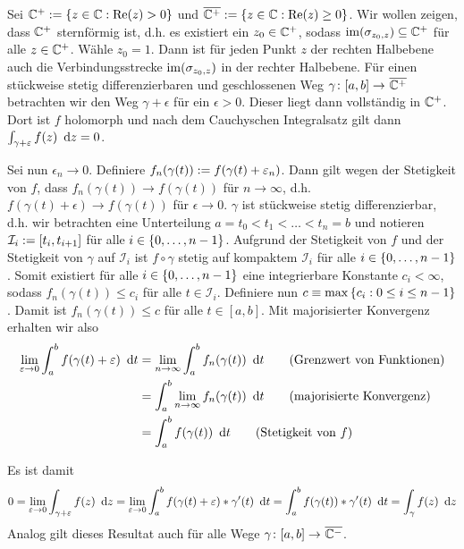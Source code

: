\begin{exercisePage}
	\pagebreak

	Sei $\mathbb{C}^+ \mathrel{:=} \left\{ z \in \mathbb{C} : \operatorname{Re}(z) > 0 \right\}$ und $\overline{\mathbb{C}^+} \mathrel{:=} \left\{ z \in \mathbb{C} : \operatorname{Re}(z) \ge 0 \right\}$. Wir wollen zeigen, dass $\mathbb{C}^+$ sternförmig ist, d.h. es existiert ein $z_0 \in \mathbb{C}^+$, sodass $\operatorname{im}(\sigma_{z_0,z}) \subseteq \mathbb{C}^+$ für alle $z \in \mathbb{C}^+$. Wähle $z_0 = 1$. Dann ist für jeden Punkt $z$ der rechten Halbebene auch die Verbindungsstrecke $\operatorname{im}(\sigma_{z_0, z})$ in der rechter Halbebene. Für einen stückweise stetig differenzierbaren und geschlossenen Weg $\abb{\gamma}{[a,b]}{\quer{\CC^+}}$ betrachten wir den Weg $\gamma + \epsilon$ für ein $\epsilon > 0$. Dieser liegt dann vollständig in $\mathbb{C}^+$. Dort ist $f$ holomorph und nach dem Cauchyschen Integralsatz gilt dann $\int_{\gamma + \varepsilon} f(z) \enskip \mathrm{d}z = 0$. 
	
	Sei nun $\epsilon_n \to 0$. Definiere $f_n(\gamma(t)) \mathrel{:=} f(\gamma(t) + \varepsilon_n)$. Dann gilt wegen der Stetigkeit von $f$, dass $f_n(\gamma(t)) \to f(\gamma(t))$ für $n \to \infty$, d.h. $f(\gamma(t) + \epsilon) \to f(\gamma(t))$ für $\epsilon \to 0$.
	$\gamma$ ist stückweise stetig differenzierbar, d.h. wir betrachten eine Unterteilung $a = t_0 < t_1 < \dots < t_n = b$ und notieren $\mathcal{I}_i \mathrel{:=} [t_i, t_{i+1}]$ für alle $i \in \left\{ 0, \dots, n-1 \right\}$. Aufgrund der Stetigkeit von $f$ und der Stetigkeit von $\gamma$ auf $\mathcal{I}_i$ ist $f \circ \gamma$ stetig auf kompaktem $\mathcal{I}_i$ für alle $i \in \left\{ 0, \dots, n-1 \right\}$. Somit existiert für alle $i \in \left\{ 0, \dots, n-1 \right\}$ eine integrierbare Konstante $c_i < \infty$, sodass $f_n(\gamma(t)) \le c_i$ für alle $t \in \mathcal{I}_i$. Definiere nun $c \equiv \max\left\{ c_i : 0 \le i \le n-1 \right\}$. Damit ist $f_n(\gamma(t)) \le c$ für alle $t \in [a,b]$. Mit majorisierter Konvergenz erhalten wir also
	\begin{align*}
		\lim_{\varepsilon \to 0} \int_a^b f(\gamma(t) + \varepsilon) \enskip \mathrm{d}t
		&= \lim_{n \to \infty} \int_a^b f_n(\gamma(t)) \enskip \mathrm{d}t \tag{Grenzwert von Funktionen} \\
		&= \int_a^b \lim_{n \to \infty} f_n(\gamma(t)) \enskip \mathrm{d}t \tag{majorisierte Konvergenz}\\
		&= \int_a^b f(\gamma(t)) \enskip \mathrm{d}t \tag{Stetigkeit von $f$}
	\end{align*}
	
	Es ist damit
	\begin{align*}
			0 = \lim_{\varepsilon \to 0} \int_{\gamma + \varepsilon} f(z) \enskip \mathrm{d}z 
			= \lim_{\varepsilon \to 0} \int_a^b f(\gamma(t) + \varepsilon) * \gamma'(t) \enskip \mathrm{d}t 
			= \int_a^b f(\gamma(t)) * \gamma'(t) \enskip \mathrm{d}t 
			= \int_\gamma f(z) \enskip \mathrm{d}z
	\end{align*}
	Analog gilt dieses Resultat auch für alle Wege $\abb{\gamma}{[a,b]}{\quer{\CC^-}}$.
	

\end{exercisePage}
